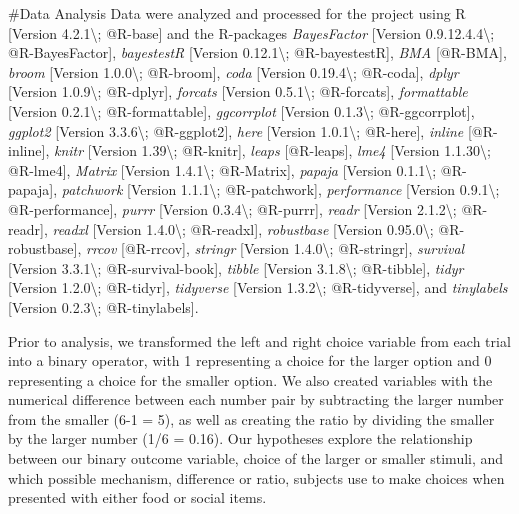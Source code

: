 \documentclass[
]{article}
\begin{document}
\#Data Analysis Data were analyzed and processed for the project using R
{[}Version 4.2.1\textbackslash; @R-base{]} and the R-packages
\emph{BayesFactor} {[}Version 0.9.12.4.4\textbackslash;
@R-BayesFactor{]}, \emph{bayestestR} {[}Version 0.12.1\textbackslash;
@R-bayestestR{]}, \emph{BMA} {[}@R-BMA{]}, \emph{broom} {[}Version
1.0.0\textbackslash; @R-broom{]}, \emph{coda} {[}Version
0.19.4\textbackslash; @R-coda{]}, \emph{dplyr} {[}Version
1.0.9\textbackslash; @R-dplyr{]}, \emph{forcats} {[}Version
0.5.1\textbackslash; @R-forcats{]}, \emph{formattable} {[}Version
0.2.1\textbackslash; @R-formattable{]}, \emph{ggcorrplot} {[}Version
0.1.3\textbackslash; @R-ggcorrplot{]}, \emph{ggplot2} {[}Version
3.3.6\textbackslash; @R-ggplot2{]}, \emph{here} {[}Version
1.0.1\textbackslash; @R-here{]}, \emph{inline} {[}@R-inline{]},
\emph{knitr} {[}Version 1.39\textbackslash; @R-knitr{]}, \emph{leaps}
{[}@R-leaps{]}, \emph{lme4} {[}Version 1.1.30\textbackslash; @R-lme4{]},
\emph{Matrix} {[}Version 1.4.1\textbackslash; @R-Matrix{]},
\emph{papaja} {[}Version 0.1.1\textbackslash; @R-papaja{]},
\emph{patchwork} {[}Version 1.1.1\textbackslash; @R-patchwork{]},
\emph{performance} {[}Version 0.9.1\textbackslash; @R-performance{]},
\emph{purrr} {[}Version 0.3.4\textbackslash; @R-purrr{]}, \emph{readr}
{[}Version 2.1.2\textbackslash; @R-readr{]}, \emph{readxl} {[}Version
1.4.0\textbackslash; @R-readxl{]}, \emph{robustbase} {[}Version
0.95.0\textbackslash; @R-robustbase{]}, \emph{rrcov} {[}@R-rrcov{]},
\emph{stringr} {[}Version 1.4.0\textbackslash; @R-stringr{]},
\emph{survival} {[}Version 3.3.1\textbackslash; @R-survival-book{]},
\emph{tibble} {[}Version 3.1.8\textbackslash; @R-tibble{]}, \emph{tidyr}
{[}Version 1.2.0\textbackslash; @R-tidyr{]}, \emph{tidyverse} {[}Version
1.3.2\textbackslash; @R-tidyverse{]}, and \emph{tinylabels} {[}Version
0.2.3\textbackslash; @R-tinylabels{]}.

Prior to analysis, we transformed the left and right choice variable
from each trial into a binary operator, with 1 representing a choice for
the larger option and 0 representing a choice for the smaller option. We
also created variables with the numerical difference between each number
pair by subtracting the larger number from the smaller (6-1 = 5), as
well as creating the ratio by dividing the smaller by the larger number
(1/6 = 0.16). Our hypotheses explore the relationship between our binary
outcome variable, choice of the larger or smaller stimuli, and which
possible mechanism, difference or ratio, subjects use to make choices
when presented with either food or social items.
\end{document}
